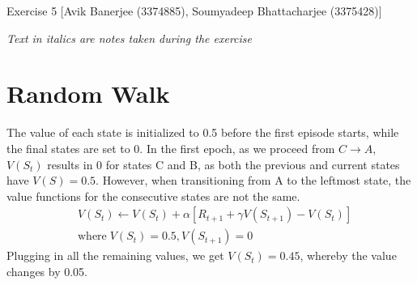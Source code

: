 \documentclass{article}
\begin{document}
\begin{center}
	{\LARGE Exercise 5}\linebreak
	{\large [Avik Banerjee (3374885), Soumyadeep Bhattacharjee (3375428)]}
\end{center}
\textit{Text in italics are notes taken during the exercise}
\section{Random Walk}
The value of each state is initialized to 0.5 before the first episode starts, while the final states are set to 0.
In the first epoch, as we proceed from $C \rightarrow A$, $V(S_t)$ results in 0 for states C and B, as both the previous and current states have $V(S) = 0.5$.
However, when transitioning from A to the leftmost state, the value functions for the consecutive states are not the same.
	\begin{equation*}
	\begin{split}
	&V(S_t) \leftarrow V(S_t) + \alpha [R_{t+1} + \gamma V(S_{t+1}) - V(S_t)]\\
	&\text{where}\; V(S_t) = 0.5, V(S_{t+1}) = 0 
	\end{split}
	\end{equation*}			
Plugging in all the remaining values, we get $V(S_t) = 0.45$, whereby the value changes by 0.05.
\end{document}

